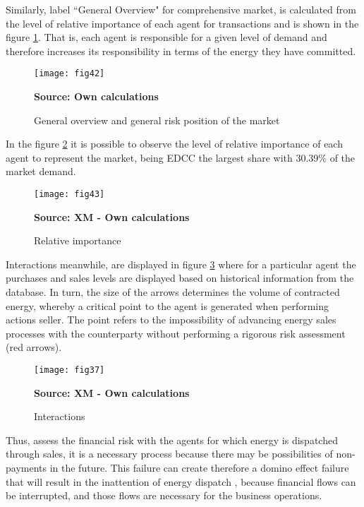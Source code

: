 \documentclass[12pt]{book}
\begin{document}
Similarly, label ``General Overview" for comprehensive market, is calculated from the level of relative importance of each agent for transactions and is shown in the figure \ref{Fig 42}. That is, each agent is responsible for a given level of demand and therefore increases its responsibility in terms of the energy they have committed. 

\begin{figure}  
\centering    
\texttt{[image: fig42]}  
\caption{General overview and general risk position of the market}
\scriptsize 
\textbf{Source: Own calculations}
\captionsetup{justification=centering,margin=1cm}   
\label{Fig 42}
\end{figure}

In the figure \ref{Fig 43} it is possible to observe the level of relative importance of each agent to represent the market, being EDCC the largest share with 30.39\% of the market demand.

\begin{figure}  
\centering    
\texttt{[image: fig43]}  
\caption{Relative importance}
\scriptsize 
\textbf{Source: XM - Own calculations}
\captionsetup{justification=centering,margin=1cm}   
\label{Fig 43}
\end{figure}

Interactions meanwhile, are displayed in figure \ref{Fig 44} where for a particular agent the purchases and sales levels are displayed based on historical information from the database. In turn, the size of the arrows determines the volume of contracted energy, whereby a critical point to the agent is generated when performing actions seller. The point refers to the impossibility of advancing energy sales processes with the counterparty without performing a rigorous risk assessment (red arrows).

\begin{figure}  
\centering    
\texttt{[image: fig37]}  
\caption{Interactions}
\scriptsize 
\textbf{Source: XM - Own calculations}
\captionsetup{justification=centering,margin=1cm}   
\label{Fig 44}
\end{figure}

Thus, assess the financial risk with the agents for which energy is dispatched through sales, it is a necessary process because there may be possibilities of non-payments in the future. This failure can create therefore a domino effect failure that will result in the inattention of energy dispatch \cite{sioshansi2002}, because financial flows can be interrupted, and those flows are necessary for the business operations.
\end{document}
